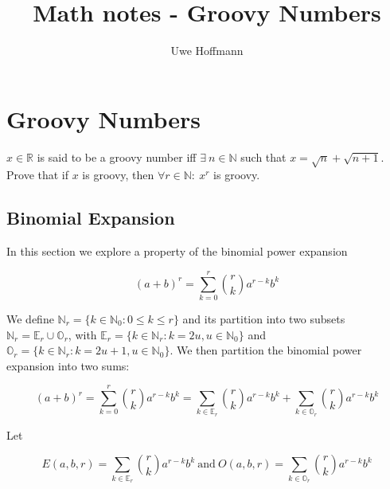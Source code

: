 

\title{Math notes - Groovy Numbers}
\author{Uwe Hoffmann}



\setcounter{chapter}{1}
\section*{Groovy Numbers}

\vspace{10 mm}
\begin{problem}
$x \in \mathbb{R}$ is said to be a groovy number iff $\exists\  n \in \mathbb{N}$ such that $x = \sqrt{n} + \sqrt{n + 1}$. Prove that if $x$ is groovy, then $\forall r \in \mathbb{N}:\ x^r$ is groovy.
\end{problem}

\subsection{Binomial Expansion}

In this section we explore a property of the binomial power expansion

\begin{equation*}
(a + b)^r = \sum_{k = 0}^r \binom{r}{k} a^{r - k} b^k
\end{equation*}

\noindent We define $\mathbb{N}_r = \{k \in \mathbb{N}_0: 0 \leq k \leq r\}$ and its partition into two subsets \mbox{$\mathbb{N}_r = \mathbb{E}_r \cup \mathbb{O}_r$}, with  \mbox{$\mathbb{E}_r = \{k \in \mathbb{N}_r: k = 2 u, u \in \mathbb{N}_0 \}$} and \\
\mbox{$\mathbb{O}_r = \{k \in \mathbb{N}_r: k  = 2 u + 1, u \in \mathbb{N}_0 \}$}. We then partition the binomial power expansion into two sums:

\begin{equation*}
(a + b)^r = \sum_{k = 0}^r \binom{r}{k} a^{r - k} b^k = \sum_{k \in \mathbb{E}_r}  \binom{r}{k} a^{r - k} b^k + \sum_{k \in \mathbb{O}_r}  \binom{r}{k} a^{r - k} b^k
\end{equation*}

\noindent Let 

\begin{equation*}
E(a, b, r) = \sum_{k \in \mathbb{E}_r}  \binom{r}{k} a^{r - k} b^k \ \text{and} \ O(a, b, r) = \sum_{k \in \mathbb{O}_r}  \binom{r}{k} a^{r - k} b^k
\end{equation*}
  
